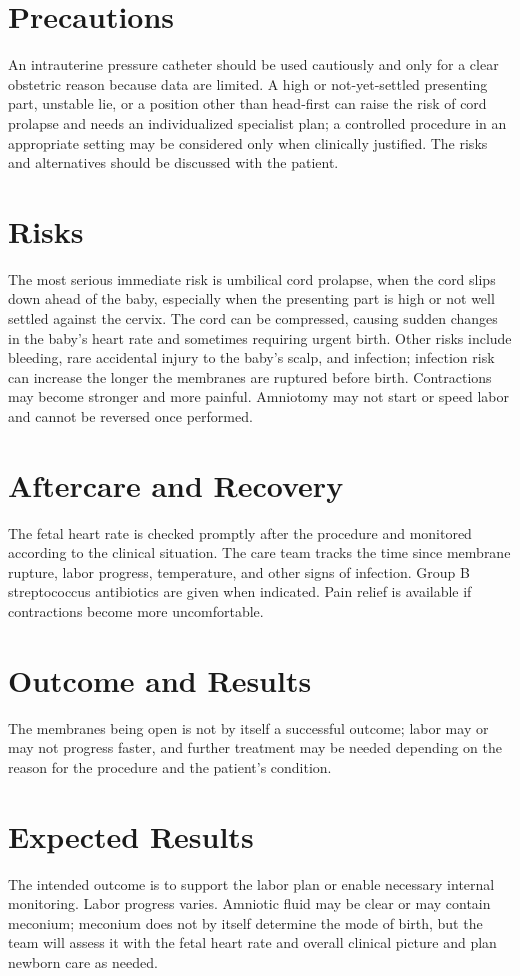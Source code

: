 \section*{Precautions}
An intrauterine pressure catheter should be used cautiously and only for a clear obstetric reason because data are limited. A high or not-yet-settled presenting part, unstable lie, or a position other than head-first can raise the risk of cord prolapse and needs an individualized specialist plan; a controlled procedure in an appropriate setting may be considered only when clinically justified. The risks and alternatives should be discussed with the patient.

\section*{Risks}
The most serious immediate risk is umbilical cord prolapse, when the cord slips down ahead of the baby, especially when the presenting part is high or not well settled against the cervix. The cord can be compressed, causing sudden changes in the baby's heart rate and sometimes requiring urgent birth. Other risks include bleeding, rare accidental injury to the baby's scalp, and infection; infection risk can increase the longer the membranes are ruptured before birth. Contractions may become stronger and more painful. Amniotomy may not start or speed labor and cannot be reversed once performed.

\section*{Aftercare and Recovery}
The fetal heart rate is checked promptly after the procedure and monitored according to the clinical situation. The care team tracks the time since membrane rupture, labor progress, temperature, and other signs of infection. Group B streptococcus antibiotics are given when indicated. Pain relief is available if contractions become more uncomfortable.

\section*{Outcome and Results}
The membranes being open is not by itself a successful outcome; labor may or may not progress faster, and further treatment may be needed depending on the reason for the procedure and the patient's condition.

\section*{Expected Results}
The intended outcome is to support the labor plan or enable necessary internal monitoring. Labor progress varies. Amniotic fluid may be clear or may contain meconium; meconium does not by itself determine the mode of birth, but the team will assess it with the fetal heart rate and overall clinical picture and plan newborn care as needed.

